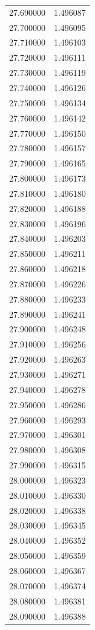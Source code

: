 \begin{tabular}{rr}
27.690000 & 1.496087 \\
27.700000 & 1.496095 \\
27.710000 & 1.496103 \\
27.720000 & 1.496111 \\
27.730000 & 1.496119 \\
27.740000 & 1.496126 \\
27.750000 & 1.496134 \\
27.760000 & 1.496142 \\
27.770000 & 1.496150 \\
27.780000 & 1.496157 \\
27.790000 & 1.496165 \\
27.800000 & 1.496173 \\
27.810000 & 1.496180 \\
27.820000 & 1.496188 \\
27.830000 & 1.496196 \\
27.840000 & 1.496203 \\
27.850000 & 1.496211 \\
27.860000 & 1.496218 \\
27.870000 & 1.496226 \\
27.880000 & 1.496233 \\
27.890000 & 1.496241 \\
27.900000 & 1.496248 \\
27.910000 & 1.496256 \\
27.920000 & 1.496263 \\
27.930000 & 1.496271 \\
27.940000 & 1.496278 \\
27.950000 & 1.496286 \\
27.960000 & 1.496293 \\
27.970000 & 1.496301 \\
27.980000 & 1.496308 \\
27.990000 & 1.496315 \\
28.000000 & 1.496323 \\
28.010000 & 1.496330 \\
28.020000 & 1.496338 \\
28.030000 & 1.496345 \\
28.040000 & 1.496352 \\
28.050000 & 1.496359 \\
28.060000 & 1.496367 \\
28.070000 & 1.496374 \\
28.080000 & 1.496381 \\
28.090000 & 1.496388 \\

\end{tabular}
